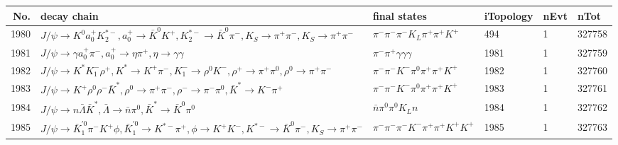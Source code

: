 \begin{table}[htbp] 
\begin{center}
\begin{small}
\begin{tabular}{rlllll}\hline\hline
 No. & decay chain & final states &  iTopology & nEvt & nTot \\\hline
1980&$J/\psi       \rightarrow K^{0}          a_{0}^{+}      K_2^{*-}       , a_{0}^{+}       \rightarrow \bar{K}^{0}   K^{+}          , K_2^{*-}        \rightarrow \bar{K}^{0}   \pi^{-}        , K_{S}           \rightarrow \pi^{+}        \pi^{-}        , K_{S}           \rightarrow \pi^{+}        \pi^{-}        $&$\pi^{-}        \pi^{-}        \pi^{-}        K_{L}          \pi^{+}        \pi^{+}        K^{+}          $&  494&    1&327758\\
1981&$J/\psi       \rightarrow \gamma       a_{0}^{+}      \pi^{-}        , a_{0}^{+}       \rightarrow \eta          \pi^{+}        , \eta           \rightarrow \gamma       \gamma       $&$\pi^{-}        \pi^{+}        \gamma       \gamma       \gamma       $& 1981&    1&327759\\
1982&$J/\psi       \rightarrow K^{*}          K_{1}^{-}      \rho^{+}      , K^{*}           \rightarrow K^{+}          \pi^{-}        , K_{1}^{-}       \rightarrow \rho^{0}      K^{-}          , \rho^{+}       \rightarrow \pi^{+}        \pi^{0}        , \rho^{0}       \rightarrow \pi^{+}        \pi^{-}        $&$\pi^{-}        \pi^{-}        K^{-}          \pi^{0}        \pi^{+}        \pi^{+}        K^{+}          $& 1982&    1&327760\\
1983&$J/\psi       \rightarrow K^{+}          \rho^{0}      \rho^{-}      \bar{K}^{*}   , \rho^{0}       \rightarrow \pi^{+}        \pi^{-}        , \rho^{-}       \rightarrow \pi^{-}        \pi^{0}        , \bar{K}^{*}    \rightarrow K^{-}          \pi^{+}        $&$\pi^{-}        \pi^{-}        K^{-}          \pi^{0}        \pi^{+}        \pi^{+}        K^{+}          $& 1983&    1&327761\\
1984&$J/\psi       \rightarrow n                 \bar{\Lambda}    \bar{K}^{*}   , \bar{\Lambda}     \rightarrow \bar{n}          \pi^{0}        , \bar{K}^{*}    \rightarrow \bar{K}^{0}   \pi^{0}        $&$\bar{n}          \pi^{0}        \pi^{0}        K_{L}          n                 $& 1984&    1&327762\\
1985&$J/\psi       \rightarrow \bar{K}_1^{'0}\pi^{-}        K^{+}          \phi           , \bar{K}_1^{'0} \rightarrow K^{*-}         \pi^{+}        , \phi            \rightarrow K^{+}          K^{-}          , K^{*-}          \rightarrow \bar{K}^{0}   \pi^{-}        , K_{S}           \rightarrow \pi^{+}        \pi^{-}        $&$\pi^{-}        \pi^{-}        \pi^{-}        K^{-}          \pi^{+}        \pi^{+}        K^{+}          K^{+}          $& 1985&    1&327763\\

\end{tabular}
\end{small}
\end{center}
\end{table}
